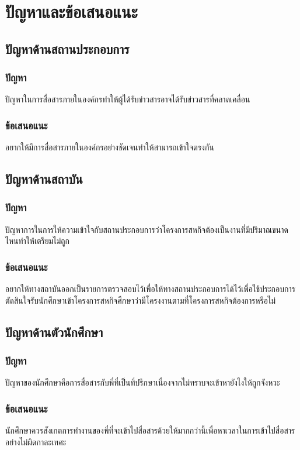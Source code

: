 \chapter{ปัญหาและข้อเสนอแนะ}
\thispagestyle{empty}
\label{chapter:result}

\section{ปัญหาด้านสถานประกอบการ}
    \subsection{ปัญหา}
        ปัญหาในการสื่อสารภายในองค์กรทำให้ผู้ได้รับข่าวสารอาจได้รับข่าวสารที่คลาดเคลื่อน
    \subsection{ข้อเสนอแนะ}
        อยากให้มีการสื่อสารภายในองค์กรอย่างชัดเจนทำให้สามารถเข้าใจตรงกัน

\section{ปัญหาด้านสถาบัน}
    \subsection{ปัญหา}
        ปัญหาการในการให้ความเข้าใจกับสถานประกอบการว่าโครงการสหกิจต้องเป็นงานที่มีปริมาณขนาดไหนทำให้เตรียมไม่ถูก
    \subsection{ข้อเสนอแนะ}
        อยากให้ทางสถาบันออกเป็นรายการตรวจสอบไว้เพื่อให้ทางสถานประกอบการได้ไว้เพื่อใช้ประกอบการตัดสินใจรับนักศึกษาเข้าโครงการสหกิจศีกษาว่ามีโครงงานตามที่โครงการสหกิจต้องการหรือไม่
\section{ปัญหาด้านตัวนักศึกษา}
    \subsection{ปัญหา}
        ปัญหาของนักศึกษาคือการสื่อสารกับพี่ที่เป็นที่ปรึกษาเนื่องจากไม่ทราบจะเข้าหายังไงให้ถูกจังหวะ
    \subsection{ข้อเสนอแนะ}
        นักศึกษาควรสังเกตการทำงานของพี่ที่จะเข้าไปสื่อสารด้วยให้มากกว่านี้เพื่อหาเวลาในการเข้าไปสื่อสารอย่างไม่ผิดกาละเทศะ
